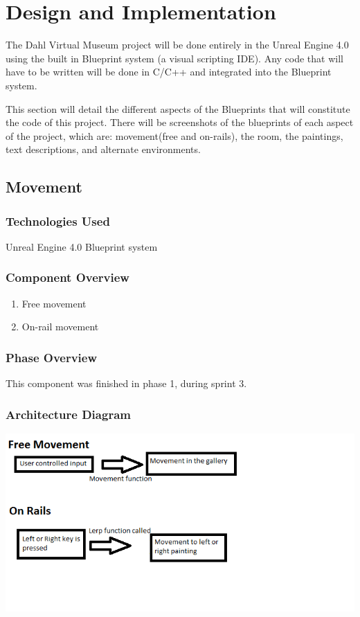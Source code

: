 
\chapter{Design  and Implementation}
The Dahl Virtual Museum project will be done entirely in the Unreal Engine 4.0 using the built in Blueprint system (a visual scripting IDE).  Any code that will have to be written will be done in C/C++ and integrated into the Blueprint system.  

This section will detail the different aspects of the Blueprints that will constitute the code of this project.  There will be screenshots of the blueprints of each aspect of the project, which are: movement(free and on-rails), the room, the paintings, text descriptions, and alternate environments. 
 

\section{Movement }

\subsection{Technologies  Used}
Unreal Engine 4.0 Blueprint system

\subsection{Component  Overview}
\begin{enumerate}
\item Free movement
\item On-rail movement
\end{enumerate}

\subsection{Phase Overview}
This component was finished in phase 1, during sprint 3. 

\subsection{ Architecture  Diagram}
\includegraphics[scale=1.0]{Diagrams/MovementDiagram.png}


